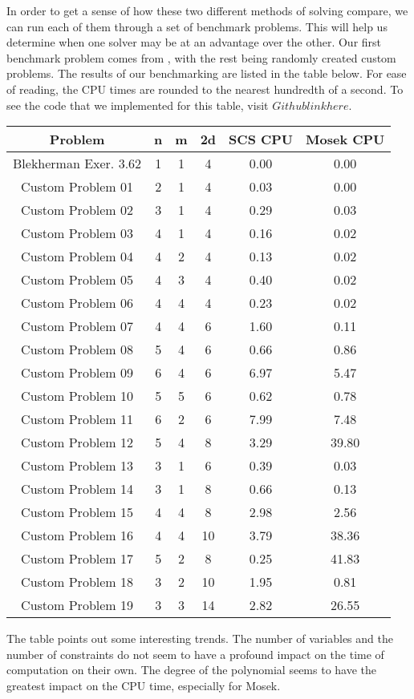 		In order to get a sense of how these two different methods of solving compare, we can run each of them through a set of benchmark problems. This will help us determine when one solver may be at an advantage over the other. Our first benchmark problem comes from \cite{BlekhermanGrigoriy;ParriloPabloA.;Thomas2013}, with the rest being randomly created custom problems. The results of our benchmarking are listed in the table below. For ease of reading, the CPU times are rounded to the nearest hundredth of a second. To see the code that we implemented for this table, visit $Github link here$.
		
		\begin{center}
			\begin{tabular}{||c | c | c | c | c | c||} 
				\hline
				Problem & n & m & 2d & SCS CPU & Mosek CPU \\
				\hline\hline
				Blekherman Exer. 3.62 & 1 & 1 & 4 & 0.00 & 0.00 \\
				\hline
				Custom Problem 01 & 2 & 1 & 4 & 0.03 & 0.00 \\
				\hline
				Custom Problem 02 & 3 & 1 & 4 & 0.29 & 0.03 \\
				\hline
				Custom Problem 03 & 4 & 1 & 4 & 0.16 & 0.02 \\
				\hline
				Custom Problem 04 & 4 & 2 & 4 & 0.13 & 0.02 \\
				\hline
				Custom Problem 05 & 4 & 3 & 4 & 0.40 & 0.02 \\
				\hline
				Custom Problem 06 & 4 & 4 & 4 & 0.23 & 0.02 \\
				\hline
				Custom Problem 07 & 4 & 4 & 6 & 1.60 & 0.11 \\
				\hline			
				Custom Problem 08 & 5 & 4 & 6 & 0.66 & 0.86 \\
				\hline
				Custom Problem 09 & 6 & 4 & 6 & 6.97 & 5.47 \\
				\hline
				Custom Problem 10 & 5 & 5 & 6 & 0.62 & 0.78 \\
				\hline
				Custom Problem 11 & 6 & 2 & 6 & 7.99 & 7.48 \\
				\hline
				Custom Problem 12 & 5 & 4 & 8 & 3.29 & 39.80 \\
				\hline
				Custom Problem 13 & 3 & 1 & 6 & 0.39 & 0.03 \\
				\hline
				Custom Problem 14 & 3 & 1 & 8 & 0.66 & 0.13 \\
				\hline
				Custom Problem 15 & 4 & 4 & 8 & 2.98 & 2.56 \\
				\hline
				Custom Problem 16 & 4 & 4 & 10 & 3.79 & 38.36 \\
				\hline
				Custom Problem 17 & 5 & 2 & 8 & 0.25 & 41.83 \\
				\hline
				Custom Problem 18 & 3 & 2 & 10 & 1.95 & 0.81 \\
				\hline
				Custom Problem 19 & 3 & 3 & 14 & 2.82 & 26.55 \\
				\hline				
			\end{tabular}
		\end{center} 
	The table points out some interesting trends. The number of variables and the number of constraints do not seem to have a profound impact on the time of computation on their own. The degree of the polynomial seems to have the greatest impact on the CPU time, especially for Mosek. 
	
